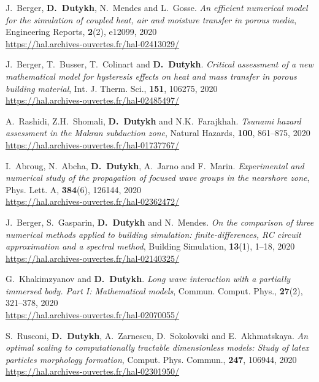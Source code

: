\documentclass[final, a4paper, oneside, 12pt]{article}
\numberwithin{equation}{section}
\begin{document}
\begin{etaremune}
  \item J.~Berger, \textbf{D.~Dutykh}, N.~Mendes and L.~Gosse. \textit{An efficient numerical model for the simulation of coupled heat, air and moisture transfer in porous media}, Engineering Reports, \textbf{2}(2), e12099, 2020 \\ %
  \url{https://hal.archives-ouvertes.fr/hal-02413029/}
  
  \item J.~Berger, T.~Busser, T.~Colinart and \textbf{D.~Dutykh}. \textit{Critical assessment of a new mathematical model for hysteresis effects on heat and mass transfer in porous building material}, Int. J. Therm. Sci., \textbf{151}, 106275, 2020 \\ %
  \url{https://hal.archives-ouvertes.fr/hal-02485497/}
  
  \item A.~Rashidi, Z.H.~Shomali, \textbf{D.~Dutykh} and N.K.~Farajkhah. \textit{Tsunami hazard assessment in the Makran subduction zone}, Natural Hazards, \textbf{100}, 861--875, 2020 \\ %
  \url{https://hal.archives-ouvertes.fr/hal-01737767/}
  
  \item I.~Abroug, N.~Abcha, \textbf{D.~Dutykh}, A.~Jarno and F.~Marin. \textit{Experimental and numerical study of the propagation of focused wave groups in the nearshore zone}, Phys. Lett. A, \textbf{384}(6), 126144, 2020 \\ %
  \url{https://hal.archives-ouvertes.fr/hal-02362472/}
  
  \item J.~Berger, S.~Gasparin, \textbf{D.~Dutykh} and N.~Mendes. \textit{On the comparison of three numerical methods applied to building simulation: finite-differences, RC circuit approximation and a spectral method}, Building Simulation, \textbf{13}(1), 1--18, 2020 \\ %
  \url{https://hal.archives-ouvertes.fr/hal-02140325/}
  
  \item G.~Khakimzyanov and \textbf{D.~Dutykh}. \textit{Long wave interaction with a partially immersed body. Part I: Mathematical models}, Commun. Comput. Phys., \textbf{27}(2), 321--378, 2020 \\ %
  \url{https://hal.archives-ouvertes.fr/hal-02070055/}
  
  \item S.~Rusconi, \textbf{D.~Dutykh}, A.~Zarnescu, D.~Sokolovski and E.~Akhmatskaya. \textit{An optimal scaling to computationally tractable dimensionless models: Study of latex particles morphology formation}, Comput. Phys. Commun., \textbf{247}, 106944, 2020 \\ %
  \url{https://hal.archives-ouvertes.fr/hal-02301950/}
  

\end{etaremune}
\end{document}
